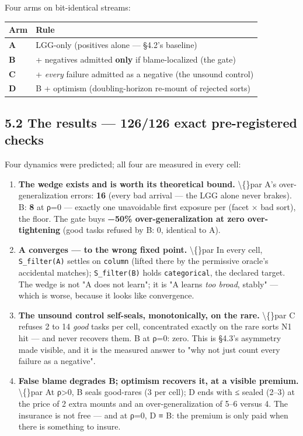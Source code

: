 \documentclass[11pt]{article}
\begin{document}
Four arms on bit-identical streams:

\begin{center}\small\begin{tabular}{ll}\toprule
Arm & Rule \\ \midrule
\textbf{A} & LGG-only (positives alone — §4.2's baseline) \\
\textbf{B} & + negatives admitted \textbf{only} if blame-localized (the gate) \\
\textbf{C} & + \emph{every} failure admitted as a negative (the unsound control) \\
\textbf{D} & B + optimism (doubling-horizon re-mount of rejected sorts) \\
\bottomrule\end{tabular}\end{center}

\subsection*{5.2 The results — 126/126 exact pre-registered checks}

Four dynamics were predicted; all four are measured in every cell:

\begin{enumerate}
\item \textbf{The wedge exists and is worth its theoretical bound.} \textbackslash\{\}par A's over-generalization errors: \textbf{16} (every bad arrival — the LGG alone never brakes). B: \textbf{8} at ρ=0 — exactly one unavoidable first exposure per (facet × bad sort), the floor. The gate buys \textbf{−50\% over-generalization at zero over-tightening} (good tasks refused by B: 0, identical to A).

\item \textbf{A converges — to the wrong fixed point.} \textbackslash\{\}par In every cell, \texttt{S\_filter(A)} settles on \texttt{column} (lifted there by the permissive oracle's accidental matches); \texttt{S\_filter(B)} holds \texttt{categorical}, the declared target. The wedge is not "A does not learn"; it is "A learns \emph{too broad}, stably" — which is worse, because it looks like convergence.

\item \textbf{The unsound control self-seals, monotonically, on the rare.} \textbackslash\{\}par C refuses 2 to 14 \emph{good} tasks per cell, concentrated exactly on the rare sorts N1 hit — and never recovers them. B at ρ=0: zero. This is §4.3's asymmetry made visible, and it is the measured answer to "why not just count every failure as a negative".

\item \textbf{False blame degrades B; optimism recovers it, at a visible premium.} \textbackslash\{\}par At ρ>0, B seals good-rares (3 per cell); D ends with ≤ sealed (2–3) at the price of 2 extra mounts and an over-generalization of 5–6 versus 4. The insurance is not free — and at ρ=0, D ≡ B: the premium is only paid when there is something to insure.
\end{enumerate}
\end{document}
